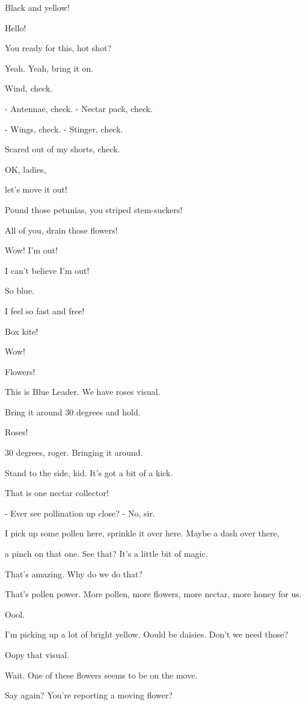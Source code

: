 \documentclass[journal]{IEEEtran}
\begin{document}
  
Black and yellow!

  
Hello!

  
You ready for this, hot shot?

  
Yeah. Yeah, bring it on.

  
Wind, check.

  
- Antennae, check.
- Nectar pack, check.

  
- Wings, check.
- Stinger, check.

  
Scared out of my shorts, check.

  
OK, ladies,

  
let's move it out!

  
Pound those petunias,
you striped stem-suckers!

  
All of you, drain those flowers!

  
Wow! I'm out!

  
I can't believe I'm out!

  
So blue.

  
I feel so fast and free!

  
Box kite!

  
Wow!

  
Flowers!

  
This is Blue Leader.
We have roses visual.

  
Bring it around 30 degrees and hold.

  
Roses!

  
30 degrees, roger. Bringing it around.

  
Stand to the side, kid.
It's got a bit of a kick.

  
That is one nectar collector!

  
- Ever see pollination up close?
- No, sir.

  
I pick up some pollen here, sprinkle it
over here. Maybe a dash over there,

  
a pinch on that one.
See that? It's a little bit of magic.

  
That's amazing. Why do we do that?

  
That's pollen power. More pollen, more
flowers, more nectar, more honey for us.

  
Oool.

  
I'm picking up a lot of bright yellow.
Oould be daisies. Don't we need those?

  
Oopy that visual.

  
Wait. One of these flowers
seems to be on the move.

  
Say again? You're reporting
a moving flower?
\end{document}
